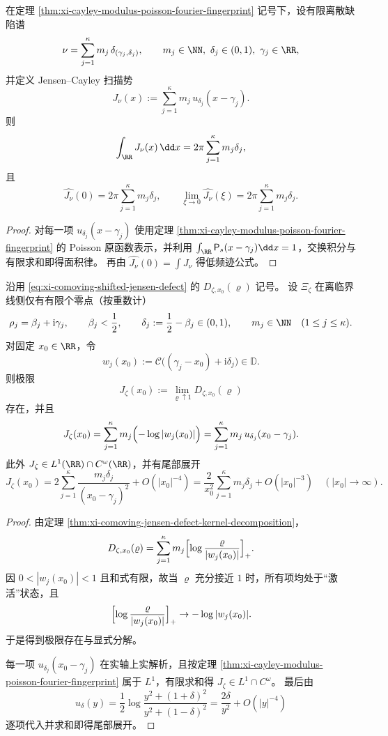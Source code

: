 \begin{corollary}[深度扫描面积律与低频迹公式]\label{cor:xi-cayley-scan-area-law-lowfreq-trace}
在定理 \ref{thm:xi-cayley-modulus-poisson-fourier-fingerprint} 记号下，设有限离散缺陷谱
\[
\nu=\sum_{j=1}^{\kappa}m_j\,\delta_{(\gamma_j,\delta_j)},
\qquad
m_j\in\NN,\ \delta_j\in(0,1),\ \gamma_j\in\RR,
\]
并定义 Jensen--Cayley 扫描势
\[
J_\nu(x):=\sum_{j=1}^{\kappa}m_j\,u_{\delta_j}(x-\gamma_j).
\]
则
\[
\int_{\RR}J_\nu(x)\,\dd x
=2\pi\sum_{j=1}^{\kappa}m_j\delta_j,
\]
且
\[
\widehat{J_\nu}(0)=2\pi\sum_{j=1}^{\kappa}m_j\delta_j,
\qquad
\lim_{\xi\to 0}\widehat{J_\nu}(\xi)=2\pi\sum_{j=1}^{\kappa}m_j\delta_j.
\]
\end{corollary}
\begin{proof}
对每一项 \(u_{\delta_j}(x-\gamma_j)\) 使用定理
\ref{thm:xi-cayley-modulus-poisson-fourier-fingerprint} 的 Poisson 原函数表示，并利用
\(\int_{\RR}\mathsf P_s(x-\gamma_j)\dd x=1\)，交换积分与有限求和即得面积律。
再由 \(\widehat{J_\nu}(0)=\int J_\nu\) 得低频迹公式。
\end{proof}

\begin{theorem}\label{thm:xi-jensen-boundary-potential-finite-defect-explicit}
沿用 \eqref{eq:xi-comoving-shifted-jensen-defect} 的 \(D_{\zeta,x_0}(\varrho)\) 记号。
设 \(\Xi_\zeta\) 在离临界线侧仅有有限个零点（按重数计）
\[
\rho_j=\beta_j+\mathrm{i}\gamma_j,\qquad
\beta_j<\frac12,\qquad
\delta_j:=\frac12-\beta_j\in(0,1),\qquad
m_j\in\NN\quad(1\le j\le \kappa).
\]
对固定 \(x_0\in\RR\)，令
\[
w_j(x_0):=\mathcal C\bigl((\gamma_j-x_0)+\mathrm{i}\delta_j\bigr)\in\mathbb D.
\]
则极限
\[
J_\zeta(x_0):=\lim_{\varrho\uparrow 1}D_{\zeta,x_0}(\varrho)
\]
存在，并且
\[
J_\zeta(x_0)
=\sum_{j=1}^{\kappa}m_j\Bigl(-\log|w_j(x_0)|\Bigr)
=\sum_{j=1}^{\kappa}m_j\,u_{\delta_j}(x_0-\gamma_j).
\]
此外 \(J_\zeta\in L^1(\RR)\cap C^\omega(\RR)\)，并有尾部展开
\[
J_\zeta(x_0)
=2\sum_{j=1}^{\kappa}\frac{m_j\delta_j}{(x_0-\gamma_j)^2}
+O(|x_0|^{-4})
=\frac{2}{x_0^2}\sum_{j=1}^{\kappa}m_j\delta_j+O(|x_0|^{-3})
\quad(|x_0|\to\infty).
\]
\end{theorem}
\begin{proof}
由定理 \ref{thm:xi-comoving-jensen-defect-kernel-decomposition}，
\[
D_{\zeta,x_0}(\varrho)=\sum_{j=1}^{\kappa}m_j\Bigl[\log\frac{\varrho}{|w_j(x_0)|}\Bigr]_+.
\]
因 \(0<|w_j(x_0)|<1\) 且和式有限，故当 \(\varrho\) 充分接近 \(1\) 时，所有项均处于“激活”状态，且
\[
\Bigl[\log\frac{\varrho}{|w_j(x_0)|}\Bigr]_+\to -\log|w_j(x_0)|.
\]
于是得到极限存在与显式分解。

每一项 \(u_{\delta_j}(x_0-\gamma_j)\) 在实轴上实解析，且按定理
\ref{thm:xi-cayley-modulus-poisson-fourier-fingerprint} 属于 \(L^1\)，有限求和得 \(J_\zeta\in L^1\cap C^\omega\)。
最后由
\[
u_\delta(y)=\frac12\log\frac{y^2+(1+\delta)^2}{y^2+(1-\delta)^2}
=\frac{2\delta}{y^2}+O(|y|^{-4})
\]
逐项代入并求和即得尾部展开。
\end{proof}

